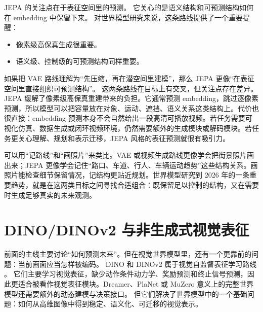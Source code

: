 \documentclass[11pt,a4paper]{ctexart}
\begin{document}
JEPA 的关注点在于表征空间里的预测。
它关心的是语义结构和可预测结构如何在 embedding 中保留下来。
对世界模型研究来说，这条路线提供了一个重要提醒：

\begin{itemize}
  \item 像素级高保真生成很重要。
  \item 语义级、控制级的可预测结构同样重要。
\end{itemize}

如果把 VAE 路线理解为“先压缩，再在潜空间里建模”，那么 JEPA 更像“在表征空间里直接组织可预测结构”。
这两条路线在目标上有交叉，但关注点存在差异。
JEPA 缓解了像素级高保真重建带来的负担。它通常预测 embedding，跳过逐像素预测，所以模型可以把容量放在对象、运动、遮挡、语义关系这类结构上。代价也很直接：embedding 预测本身不会自然给出一段高清可播放视频。若任务需要可视化仿真、数据生成或闭环视频环境，仍然需要额外的生成模块或解码模块。若任务更关心理解、规划和表示迁移，JEPA 风格的表征预测就很有吸引力。

可以用“记路线”和“画照片”来类比。VAE 或视频生成路线更像学会把街景照片画出来；JEPA 更像学会记住“路口、车道、行人、车辆运动趋势”这些结构关系。画照片能检查细节保留情况，记结构更贴近规划。世界模型研究到 2026 年的一条重要趋势，就是在这两类目标之间寻找合适组合：既保留足以控制的结构，又在需要时生成足够真实的未来观测。

\section{DINO/DINOv2 与非生成式视觉表征}

前面的主线主要讨论“如何预测未来”。但在视觉世界模型里，还有一个更靠前的问题：当前画面应当怎样被编码。
DINO 和 DINOv2 属于视觉自监督表征学习路线 \cite{caron2021dino,oquab2023dinov2}。
它们主要学习视觉表征，缺少动作条件动力学、奖励预测和终止信号预测，因此更适合被看作视觉表征模块。Dreamer、PlaNet 或 MuZero 意义上的完整世界模型还需要额外的动态建模与决策接口。
但它们解决了世界模型中的一个基础问题：如何从高维图像中得到稳定、语义化、可迁移的视觉表示。
\end{document}
